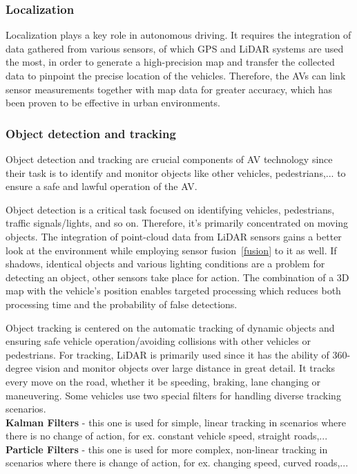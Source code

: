 \documentclass[10pt,oneside,english,a4paper]{article}
\begin{document}
\subsubsection{Localization}
\indent Localization plays a key role in autonomous driving. It requires the integration of data gathered from various sensors, of which GPS and LiDAR systems are used the most, in order to generate a high-precision map and transfer the collected data to pinpoint the precise location of the vehicles. Therefore, the AVs can link sensor measurements together with map data for greater accuracy, which has been proven to be effective in urban environments. 
\cite{approach}\cite{computerarch}

\subsubsection{Object detection and tracking}
\indent Object detection and tracking are crucial components of AV technology since their task is to identify and monitor objects like other vehicles, pedestrians,... to ensure a safe and lawful operation of the AV. 
\par Object detection is a critical task focused on identifying vehicles, pedestrians, traffic signals/lights, and so on. Therefore, it's primarily concentrated on moving objects. The integration of point-cloud data from LiDAR sensors gains a better look at the environment while employing sensor fusion~\ref{fusion} to it as well. If shadows, identical objects and various lighting conditions are a problem for detecting an object, other sensors take place for action. The combination of a 3D map with the vehicle's position enables targeted processing which reduces both processing time and the probability of false detections.
\par Object tracking is centered on the automatic tracking of dynamic objects and ensuring safe vehicle operation/avoiding collisions with other vehicles or pedestrians. For tracking, LiDAR is primarily used since it has the ability of 360-degree vision and monitor objects over large distance in great detail. It tracks every move on the road, whether it be speeding, braking, lane changing or maneuvering. Some vehicles use two special filters for handling diverse tracking scenarios.\\
\indent \textbf{Kalman Filters} - this one is used for simple, linear tracking in scenarios where there is no change of action, for ex. constant vehicle speed, straight roads,...\\
\indent \textbf{Particle Filters} - this one is used for more complex, non-linear tracking in scenarios where there is change of action, for ex. changing speed, curved roads,...
\cite{stateoftheart}\cite{approach}
\end{document}
